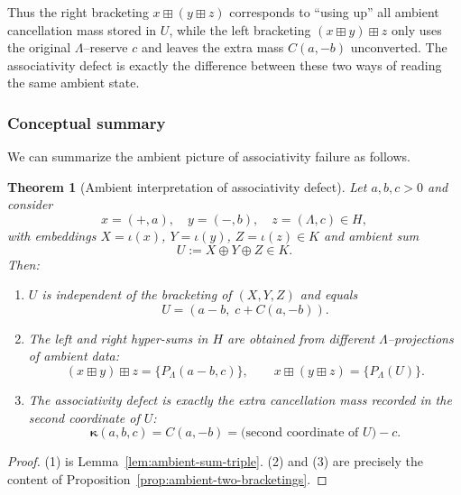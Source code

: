 \documentclass[11pt]{amsart}
\numberwithin{equation}{section}
\newtheorem{theorem}{Theorem}[section]
\theoremstyle{definition}
\theoremstyle{remark}
\newcommand{\Hnum}{H}                      %
\newcommand{\AssocCurv}{\boldsymbol{\kappa}} %
\newcommand{\Kamb}{K}                      %
\newcommand{\op}{\boxplus}                 %
\newcommand{\Cfun}{C}                      %
\begin{document}
Thus the right bracketing $x\op(y\op z)$ corresponds to ``using up''
all ambient cancellation mass stored in $U$, while the left bracketing
$(x\op y)\op z$ only uses the original $\Lambda$--reserve $c$ and
leaves the extra mass $\Cfun(a,-b)$ unconverted.  The associativity
defect is exactly the difference between these two ways of reading the
same ambient state.

\subsubsection*{Conceptual summary}

We can summarize the ambient picture of associativity failure as
follows.

\begin{theorem}[Ambient interpretation of associativity defect]
\label{thm:ambient-defect-summary}
Let $a,b,c>0$ and consider
\[
  x=(+,a),\quad y=(-,b),\quad z=(\Lambda,c)\in\Hnum,
\]
with embeddings $X=\iota(x)$, $Y=\iota(y)$, $Z=\iota(z)\in\Kamb$ and
ambient sum
\[
  U := X\oplus Y\oplus Z\in\Kamb.
\]
Then:
\begin{enumerate}
  \item $U$ is independent of the bracketing of $(X,Y,Z)$ and equals
  \[
    U=(a-b,\; c+\Cfun(a,-b)).
  \]
  \item The left and right hyper-sums in $\Hnum$ are obtained from
        \emph{different} $\Lambda$--projections of ambient data:
  \[
    (x\op y)\op z
    = \{P_\Lambda(a-b,c)\},
    \qquad
    x\op(y\op z)
    = \{P_\Lambda(U)\}.
  \]
  \item The associativity defect is exactly the extra cancellation
        mass recorded in the second coordinate of $U$:
  \[
    \AssocCurv(a,b,c)
    = \Cfun(a,-b)
    = \text{(second coordinate of $U$)} - c.
  \]
\end{enumerate}
\end{theorem}

\begin{proof}
(1) is Lemma~\ref{lem:ambient-sum-triple}.  (2) and (3) are precisely
the content of Proposition~\ref{prop:ambient-two-bracketings}.
\end{proof}
\end{document}
